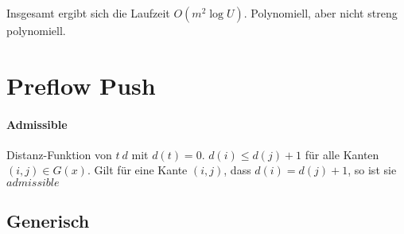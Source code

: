 Insgesamt ergibt sich die Laufzeit $O(m^2 \log U)$. Polynomiell, aber nicht streng polynomiell.

\newpage


\section{Preflow Push}
\label{sec-5}
\paragraph{Admissible} Distanz-Funktion von $t\ d$ mit $d(t)= 0$. $d(i) \leq d(j)+ 1$ für alle Kanten $(i,j) \in G(x)$. Gilt für eine Kante $(i,j)$, dass $d(i) = d(j) + 1$, so ist sie $admissible$

\subsection{Generisch}
